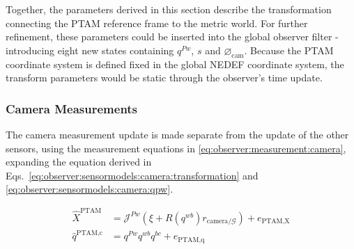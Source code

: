         Together, the parameters derived in this section describe the transformation
        connecting the PTAM reference frame to the metric world.
        For further refinement, these parameters could be inserted into the
        global observer filter - introducing eight new states containing
        $q^{Pw}$, $s$ and $\varnothing_{\text{cam}}$.%
        Because the PTAM coordinate system is defined fixed in the global NEDEF coordinate system,
        the transform parameters would be static through the observer's time update.

    \subsubsection{Camera Measurements}
        \label{sssec:observer:sensormodels:camera:refinement}
        The camera measurement update is made separate from the update of the other sensors, using
        the measurement equations in \eqref{eq:observer:measurement:camera}, expanding the
        equation derived in Eqs.~\eqref{eq:observer:sensormodels:camera:transformation} and \eqref{eq:observer:sensormodels:camera:qpw}.

        \begin{subequations}
            \label{eq:observer:measurement:camera}
            \begin{align}
                \hat{X}^{\text{PTAM}} &= \mathcal{J}^{Pw} (\xi + R(q^{wb})r_{\text{camera}/\mathcal{G}}) + e_{\text{PTAM,X}} \\
                \hat{q}^{\text{PTAM,c}} &= q^{Pw} q^{wb} q^{bc} + e_{\text{PTAM,q}}
            \end{align}
        \end{subequations}

